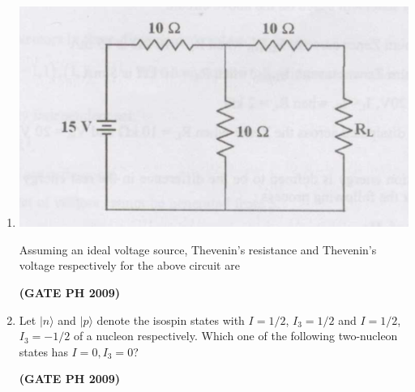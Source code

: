 \documentclass[14pt, a4paper]{extarticle}
\begin{document}
\begin{enumerate}[label=\textbf{Q. \arabic*}, start=21]
\item \leavevmode \par
    \begin{center}
        \includegraphics[width=0.6\columnwidth]{figs/Q37fig.png}
        \label{fig:q37}
    \end{center}
Assuming an ideal voltage source, Thevenin's resistance and Thevenin's voltage respectively for the above circuit are
\begin{enumerate}
\end{enumerate}
\hfill \textbf{(GATE PH 2009)}

\item Let $|n\rangle$ and $|p\rangle$ denote the isospin states with $I = 1/2$, $I_3 = 1/2$ and $I = 1/2$, $I_3 = -1/2$ of a nucleon respectively. Which one of the following two-nucleon states has $I=0, I_3=0$?
\begin{enumerate}
\end{enumerate}
\hfill \textbf{(GATE PH 2009)}


\end{enumerate}
\end{document}
